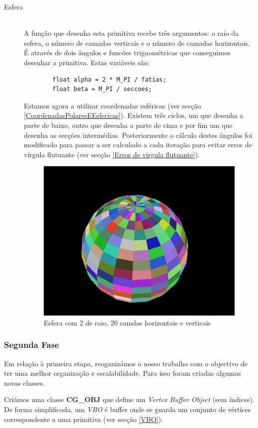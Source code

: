 \documentclass[a5paper,onecolumn, 11pt]{article}
\begin{document}
\begin{description}
	\item[Esfera] \hfill \\
	A função que desenha esta primitiva recebe três argumentos: o raio da esfera, o número de camadas verticais e o número de camadas horizontais. É através de dois ângulos e funcões trignométricas que conseguimos desenhar a primitiva. Estas variáveis são:
	\begin{verbatim}
		float alpha = 2 * M_PI / fatias;
		float beta = M_PI / seccoes;
	\end{verbatim}
	Estamos agora a utilizar coordenadas esféricas (ver secção \ref{CoordenadasPolaresEEsfericas}). Existem três ciclos, um que desenha a parte de baixo, outro que desenha a parte de cima e por fim um que desenha as secções intermédias.
	Posteriormente o cálculo destes ângulos foi modificado para passar a ser calculado a cada iteração para evitar erros de vírgula flutuante (ver secção \ref{Erros de virgula flutuante}).
	\begin{figure}[h!b!t!]
		\centering
		\includegraphics[scale=0.7]{esfera.png}
		\caption{Esfera com 2 de raio, 20 camdas horizontais e verticais}
	\end{figure}
\end{description}
\clearpage
\subsubsection{Segunda Fase}
Em relação à primeira etapa, reoganizámos o nosso trabalho com o objectivo de ter uma melhor organização e escalabilidade. Para isso foram criadas algumas novas classes.

Criámos uma classe \textbf{CG\_OBJ} que define um \textit{Vertex Buffer Object} (sem índices). De forma simplificada, um \textit{VBO} é buffer onde se guarda um conjunto de vértices correspondente a uma primitiva (ver secção \ref{VBO}).
\end{document}
